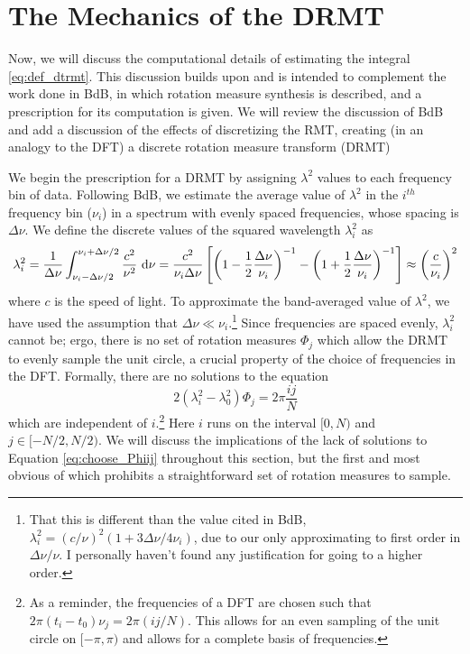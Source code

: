 \section{The Mechanics of the DRMT}\label{sec:mechanics}

Now, we will discuss the computational details of estimating the integral \ref{eq:def_dtrmt}. This
discussion builds upon and is intended to complement the work done in
BdB, in
which rotation measure synthesis is described, and a prescription for its computation is given. We
will review the discussion of BdB and add a discussion of the effects of
discretizing the RMT, creating (in an analogy to the DFT) a discrete
rotation measure transform (DRMT)

We begin the prescription for a DRMT by assigning $\lambda^2$ values to each frequency bin of data.
Following BdB, we estimate the average value of $\lambda^2$ in the $i^{th}$ frequency bin ($\nu_i$)
in a spectrum with evenly spaced frequencies, whose spacing is $\Delta\nu$. We define the discrete
values of the squared wavelength $\lambda^2_i$ as
\begin{equation}
  \lambda_i^2 = 
  \frac{1}{\Delta\nu}\int_{\nu_i-\Delta\nu/2}^{\nu_i+\Delta\nu/2} \frac{c^2}{\nu^2}\ \mathrm{d}\nu
  = \frac{c^2}{\nu_i\Delta\nu}\left[
    \left(1 - \frac{1}{2}\frac{\Delta\nu}{\nu_i}\right)^{-1} 
  - \left(1 + \frac{1}{2}\frac{\Delta\nu}{\nu_i}\right)^{-1} \right]
  \approx
  \left(\frac{c}{\nu_i}\right)^2
  \label{eq:def_lambda2}
\end{equation}
where $c$ is the speed of light. To approximate the band-averaged value of $\lambda^2$, we have used 
the assumption that $\Delta\nu \ll \nu_i$.\footnote{That this is different than the value cited in
BdB, $\lambda^2_i = (c/\nu)^2(1 + 3\Delta\nu/4\nu_i)$, due to our only approximating to first order
in $\Delta\nu/\nu$. I personally haven't found any justification for going to a higher order.} Since frequencies are spaced evenly, $\lambda_i^2$ cannot
be; ergo, there is no set of rotation measures $\Phi_j$ which allow the DRMT to evenly sample the
unit circle, a crucial property of the choice of frequencies in the DFT. Formally, there are no
solutions to the equation 
\begin{equation}
  2(\lambda_i^2 - \lambda_0^2)\Phi_j = 2\pi\frac{ij}{N}
  \label{eq:choose_Phiij}
\end{equation}
which are independent of $i$.\footnote{As a reminder, the frequencies of a DFT are chosen such that
  $2\pi(t_i-t_0)\nu_j = 2\pi(ij/N)$. This allows for an even sampling of the unit circle on
  $[-\pi,\pi)$ and allows for a complete basis of frequencies.} 
Here $i$ runs on the interval $[0,N)$ and $j\in[-N/2,N/2)$. We will discuss the implications of the
lack of solutions to Equation \ref{eq:choose_Phiij} throughout this section, but the first and
most obvious of which prohibits a straightforward set of rotation measures to sample.

